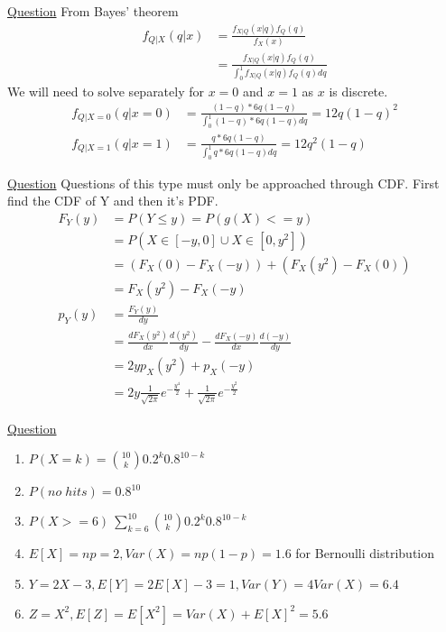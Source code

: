 \documentclass[11pt, a4paper]{article}
\begin{document}
\begin{enumerate}
        \hypertarget{a_bayes}{\item} \hyperlink{q_bayes}{Question}\newline
        From Bayes' theorem 
        \begin{align*}
            f_{Q|X}(q|x) &= \frac{f_{X|Q}(x|q) f_{Q}(q)}{f_{X}(x)}\\
                        &= \frac{f_{X|Q}(x|q) f_{Q}(q)}{\int_{0}^{1} f_{X|Q}(x|q) f_{Q}(q) dq}
        \end{align*}
        We will need to solve separately for $x = 0$ and $x = 1$ as $x$ is discrete.
        \begin{align*}
            f_{Q|X=0}(q|x=0) &= \frac{(1-q)* 6q(1-q)}{\int_{0}^{1} (1-q)*6q(1-q) dq} = 12q(1-q)^{2}\\
            f_{Q|X=1}(q|x=1) &= \frac{q* 6q(1-q)}{\int_{0}^{1} q*6q(1-q) dq} = 12q^{2}(1-q)
        \end{align*}
        
        \hypertarget{a_normaltr}{\item} \hyperlink{q_normaltr}{Question}\newline
        Questions of this type must only be approached through CDF. First find the CDF of Y and then it's PDF.
        \begin{align*}
            F_{Y}(y) &= P(Y \leq y) = P(g(X) <= y)\\
                    &= P(X \in [-y, 0] \cup X \in [0, y^{2}])\\
                    &= (F_{X}(0) - F_{X}(-y)) + (F_{X}(y^{2}) - F_{X}(0))\\
                    &= F_{X}(y^{2}) - F_{X}(-y)\\
            p_{Y}(y) &= \frac{F_{Y}(y)}{dy}\\
                    &= \frac{dF_{X}(y^{2})}{dx} \frac{d(y^{2})}{dy} - \frac{dF_{X}(-y)}{dx} \frac{d(-y)}{dy}\\
                    &= 2yp_{X}(y^{2}) + p_{X}(-y)\\
                    &= 2y\frac{1}{\sqrt{2\pi}}e^{-\frac{y^{4}}{2}} + \frac{1}{\sqrt{2\pi}} e^{-\frac{y^{2}}{2}}
        \end{align*}
        
        \hypertarget{a_binshoot}{\item} \hyperlink{q_binshoot}{Question}
        \begin{enumerate}
            \item $P(X=k) = \binom{10}{k} 0.2^{k}0.8^{10-k}$
            \item $P(no\;hits) = 0.8^{10}$
            \item $P(X>=6) \ \sum_{k=6}^{10} \binom{10}{k} 0.2^{k}0.8^{10-k}$
            \item $E[X] = np = 2, Var(X) = np(1-p) = 1.6$ for Bernoulli distribution
            \item $Y = 2X - 3, E[Y] = 2E[X] - 3 = 1, Var(Y) = 4Var(X) = 6.4$
            \item $Z = X^{2}, E[Z] = E[X^{2}] = Var(X) + E[X]^{2} = 5.6$
        \end{enumerate}


\end{enumerate}
\end{document}
